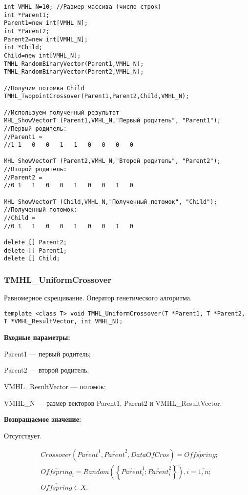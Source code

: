 \documentclass[a4paper,12pt]{article}
\begin{document}
\begin{lstlisting}[label=code_use_TMHL_TwopointCrossover,caption=Пример использования]
int VMHL_N=10; //Размер массива (число строк)
int *Parent1;
Parent1=new int[VMHL_N];
int *Parent2;
Parent2=new int[VMHL_N];
int *Child;
Child=new int[VMHL_N];
TMHL_RandomBinaryVector(Parent1,VMHL_N);
TMHL_RandomBinaryVector(Parent2,VMHL_N);

//Получим потомка Child
TMHL_TwopointCrossover(Parent1,Parent2,Child,VMHL_N);

//Используем полученный результат
MHL_ShowVectorT (Parent1,VMHL_N,"Первый родитель", "Parent1");
//Первый родитель:
//Parent1 =
//1	1	0	0	1	1	0	0	0	0

MHL_ShowVectorT (Parent2,VMHL_N,"Второй родитель", "Parent2");
//Второй родитель:
//Parent2 =
//0	1	1	0	0	1	0	0	1	0

MHL_ShowVectorT (Child,VMHL_N,"Полученный потомок", "Child");
//Полученный потомок:
//Child =
//0	1	1	0	0	1	0	0	1	0

delete [] Parent2;
delete [] Parent1;
delete [] Child;
\end{lstlisting}

\subsubsection{TMHL\_UniformCrossover}\label{TMHL_UniformCrossover}

Равномерное скрещивание. Оператор генетического алгоритма.


\begin{lstlisting}[label=code_syntax_TMHL_UniformCrossover,caption=Синтаксис]
template <class T> void TMHL_UniformCrossover(T *Parent1, T *Parent2, T *VMHL_ResultVector, int VMHL_N);
\end{lstlisting}

\textbf{Входные параметры:}
 
 Parent1 --- первый родитель;
 
 Parent2 --- второй родитель;
 
 VMHL\_ResultVector --- потомок;
 
 VMHL\_N --- размер векторов Parent1, Parent2 и VMHL\_ResultVector.

\textbf{Возвращаемое значение:}

 Отсутствует.
 
\begin{align*}
&Crossover \left( \overline{Parent}^1, \overline{Parent}^2, DataOfCros\right) = \overline{Offspring};\\
& \overline{Offspring}_i=Random\left( \left\lbrace \overline{Parent}^1_i;\overline{Parent}^2_i\right\rbrace \right), i=\overline{1,n} ;\nonumber\\
&\overline{Offspring}\in X.\nonumber
\end{align*}
\end{document}
